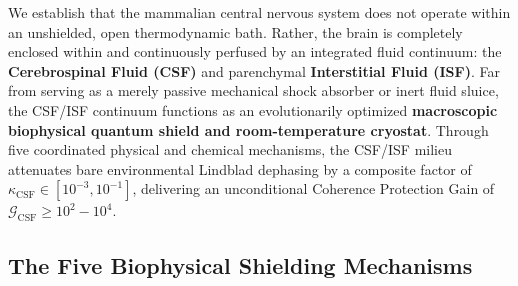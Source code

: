 \documentclass[10pt,twocolumn,3p]{article}
\begin{document}
We establish that the mammalian central nervous system does not operate within an unshielded, open thermodynamic bath. Rather, the brain is completely enclosed within and continuously perfused by an integrated fluid continuum: the \textbf{Cerebrospinal Fluid (CSF)} and parenchymal \textbf{Interstitial Fluid (ISF)}. Far from serving as a merely passive mechanical shock absorber or inert fluid sluice, the CSF/ISF continuum functions as an evolutionarily optimized \textbf{macroscopic biophysical quantum shield and room-temperature cryostat}. Through five coordinated physical and chemical mechanisms, the CSF/ISF milieu attenuates bare environmental Lindblad dephasing by a composite factor of $\kappa_{\text{CSF}} \in [10^{-3}, 10^{-1}]$, delivering an unconditional Coherence Protection Gain of $\mathcal{G}_{\text{CSF}} \ge 10^2 - 10^4$.

\subsection{The Five Biophysical Shielding Mechanisms}
\label{subsec:csf_mechanisms}
\end{document}
